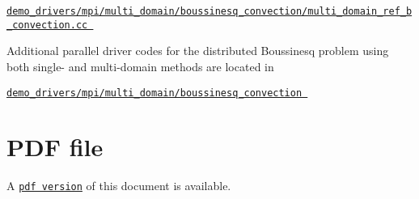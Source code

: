 \begin{center} \href{../../../../demo_drivers/mpi/multi_domain/boussinesq_convection/multi_domain_ref_b_convection.cc}{\tt demo\+\_\+drivers/mpi/multi\+\_\+domain/boussinesq\+\_\+convection/multi\+\_\+domain\+\_\+ref\+\_\+b\+\_\+convection.\+cc } \end{center} 

Additional parallel driver codes for the distributed Boussinesq problem using both single-\/ and multi-\/domain methods are located in

\begin{center} \href{../../../../demo_drivers/mpi/multi_domain/boussinesq_convection}{\tt demo\+\_\+drivers/mpi/multi\+\_\+domain/boussinesq\+\_\+convection } \end{center} 



 

 \hypertarget{index_pdf}{}\section{P\+D\+F file}\label{index_pdf}
A \href{../latex/refman.pdf}{\tt pdf version} of this document is available. 
